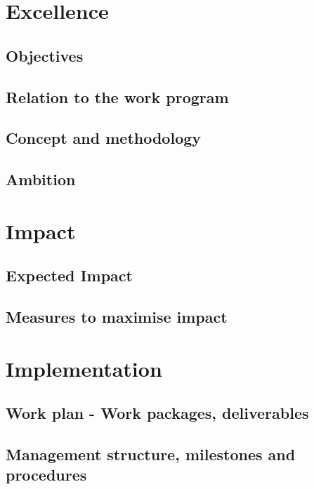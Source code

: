 \documentclass[12pt]{book}
\begin{document}
\chapter{Excellence}

\section{Objectives}



\section{Relation to the work program}



\section{Concept and methodology}

\section{Ambition}

\chapter{Impact}

\section{Expected Impact}



\section{Measures to maximise impact}

\chapter{Implementation}

\section{Work plan - Work packages, deliverables}



\section{Management structure, milestones and procedures}
\end{document}
